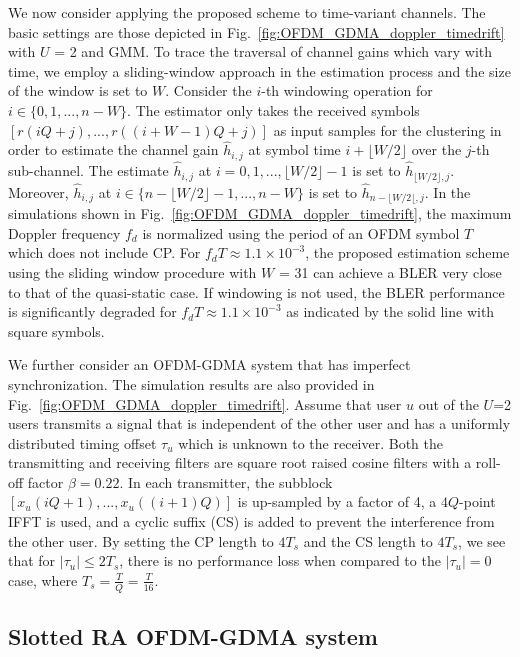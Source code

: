 We now consider applying the proposed scheme to time-variant channels.  The basic settings are those depicted in Fig.~\ref{fig:OFDM_GDMA_doppler_timedrift} with $U$ = 2 and GMM.  To trace the traversal of channel gains which vary with time, we employ a sliding-window approach in the estimation process and the size of the window is set to $W$.  Consider the $i$-th windowing operation for $i \in \{0, 1, ..., n-W\}$.  The estimator only takes the received symbols $[r(iQ+j),...,r((i+W-1)Q+j)]$ as input samples for the clustering in order to estimate the channel gain $\hat{h}_{i,j}$ at symbol time $i + \lfloor W/2 \rfloor$ over the $j$-th sub-channel. The estimate $\hat{h}_{i,j}$ at $i = 0, 1, ..., \lfloor W/2 \rfloor-1$ is set to $\hat{h}_{\lfloor W/2 \rfloor,j}$.
Moreover,  $\hat{h}_{i,j}$ at $i \in \{n-\lfloor W/2 \rfloor-1, ..., n-W\}$ is set to $\hat{h}_{n-\lfloor W/2 \lfloor,j}$.
In the simulations shown in Fig.~\ref{fig:OFDM_GDMA_doppler_timedrift}, the maximum Doppler frequency $f_d$ is normalized using the period of an OFDM symbol $T$ which does not include CP. For $f_dT \approx 1.1 \times 10^{-3}$, the proposed estimation scheme
using the sliding window procedure with $W$ = 31 can achieve a BLER very close to that of the quasi-static case.  If windowing is not used, the BLER performance is significantly degraded for $f_dT \approx 1.1 \times 10^{-3}$ as indicated by the solid line with square symbols.

  We further consider an OFDM-GDMA system that has imperfect synchronization.  The simulation results are also provided in Fig.~\ref{fig:OFDM_GDMA_doppler_timedrift}.  Assume that user $u$ out of the $U$=2 users transmits a signal that is independent of the other user and has a uniformly distributed timing offset $\tau_u$ which is unknown to the receiver. Both the transmitting and receiving filters are square root raised cosine filters with a roll-off factor $\beta=0.22$.  In each transmitter, the  subblock $[x_u(iQ+1), ..., x_u((i+1)Q)]$ is up-sampled by a factor of 4, a $4Q$-point IFFT is used, and a cyclic suffix (CS) is added to prevent the interference from the other user.  By setting the CP length to $4T_s$ and the CS length to $4T_s$, we see that for $|\tau_u| \le 2T_s$, there is no performance loss when compared to the $|\tau_u| = 0$ case, where $T_s = \frac{T}{Q} = \frac{T}{16}$.
  
 

\subsection{Slotted RA OFDM-GDMA system}

